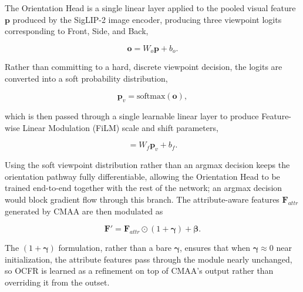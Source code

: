 \documentclass{ieeeaccess}
\begin{document}
The Orientation Head is a single linear layer applied to the pooled visual feature $\mathbf{p}$ produced by the SigLIP-2 image encoder, producing three viewpoint logits corresponding to Front, Side, and Back,

\begin{equation}
\mathbf{o}=W_{o}\mathbf{p}+b_{o}.
\label{eq:orient_logits}
\end{equation}

Rather than committing to a hard, discrete viewpoint decision, the logits are converted into a soft probability distribution,

\begin{equation}
\mathbf{p}_{v}=\mathrm{softmax}(\mathbf{o}),
\label{eq:orient_softmax}
\end{equation}

which is then passed through a single learnable linear layer to produce Feature-wise Linear Modulation (FiLM) scale and shift parameters,

\begin{equation}
[\boldsymbol{\gamma},\boldsymbol{\beta}]=W_{f}\mathbf{p}_{v}+b_{f}.
\label{eq:film_params}
\end{equation}

Using the soft viewpoint distribution rather than an argmax decision keeps the orientation pathway fully differentiable, allowing the Orientation Head to be trained end-to-end together with the rest of the network; an argmax decision would block gradient flow through this branch. The attribute-aware features $\mathbf{F}_{attr}$ generated by CMAA are then modulated as

\begin{equation}
\mathbf{F}'=\mathbf{F}_{attr}\odot(1+\boldsymbol{\gamma})+\boldsymbol{\beta}.
\label{eq:ocfr_output}
\end{equation}

The $(1+\boldsymbol{\gamma})$ formulation, rather than a bare $\boldsymbol{\gamma}$, ensures that when $\boldsymbol{\gamma}\approx 0$ near initialization, the attribute features pass through the module nearly unchanged, so OCFR is learned as a refinement on top of CMAA's output rather than overriding it from the outset.
\end{document}
